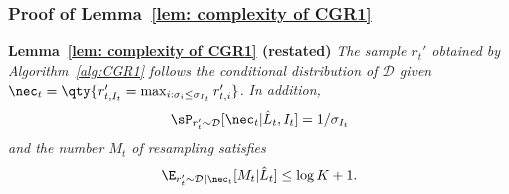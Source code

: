 \subsubsection{Proof of Lemma~\ref{lem: complexity of CGR1}}\label{subsection:proof_cgr1}
\textbf{Lemma~\ref{lem: complexity of CGR1} (restated)} 
\textit{The sample $r_t'$ obtained by Algorithm~\ref{alg:CGR1} follows the conditional distribution of $\mathcal{D}$ given $\nec_t=\qty{r_{t,I_t}'=\max_{i:\sigma_i\leq\sigma_{I_t}}r_{t,i}'}$.}
\textit{In addition,}
\begin{align*}
\sP_{r_t' \sim \mathcal{D}}[\nec_t|\hat{L}_t,I_t]=1/\sigma_{I_t}
\end{align*}
\textit{and the number $M_t$ of resampling satisfies}
\begin{align*}
    \E_{r_t'\sim \mathcal{D}|\nec_t}[M_t|\hat{L}_t]\leq\log K+1.
\end{align*}

